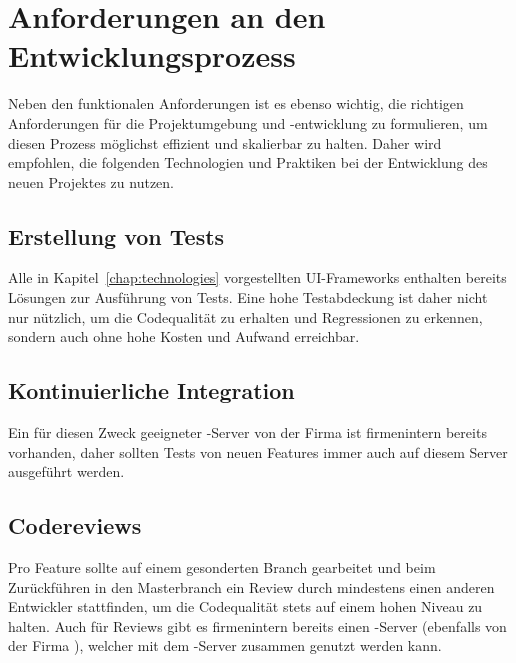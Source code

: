 \section{Anforderungen an den Entwicklungsprozess}
Neben den funktionalen Anforderungen ist es ebenso wichtig, die richtigen Anforderungen für die Projektumgebung und -entwicklung zu formulieren, um diesen Prozess möglichst effizient und skalierbar zu halten. Daher wird empfohlen, die folgenden Technologien und Praktiken bei der Entwicklung des neuen Projektes zu nutzen.

\subsection{Erstellung von Tests}
Alle in Kapitel~\ref{chap:technologies} vorgestellten UI-Frameworks enthalten bereits Lösungen zur Ausführung von Tests. Eine hohe Testabdeckung ist daher nicht nur nützlich, um die Codequalität zu erhalten und Regressionen zu erkennen, sondern auch ohne hohe Kosten und Aufwand erreichbar.

\subsection{Kontinuierliche Integration}
Ein für diesen Zweck geeigneter -Server von der Firma  ist firmenintern bereits vorhanden, daher sollten Tests von neuen Features immer auch auf diesem Server ausgeführt werden.

\subsection{Codereviews}
Pro Feature sollte auf einem gesonderten Branch gearbeitet und beim Zurückführen in den Masterbranch ein Review durch mindestens einen anderen Entwickler stattfinden, um die Codequalität stets auf einem hohen Niveau zu halten. Auch für Reviews gibt es firmenintern bereits einen -Server (ebenfalls von der Firma ), welcher mit dem -Server zusammen genutzt werden kann.

